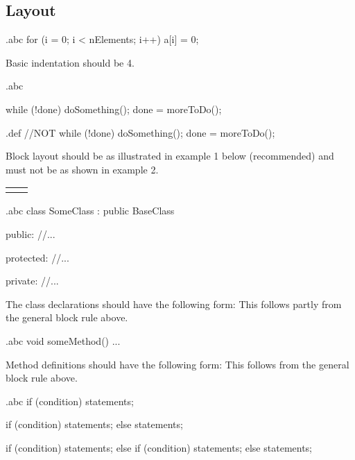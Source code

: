 \subsection{Layout}

\begin{filecontents*}{\jobname.abc}
    for (i = 0; i < nElements; i++)
        a[i] = 0;
\end{filecontents*}

\recommendation
{Basic indentation should be 4.}
{}
{}


\begin{filecontents*}{\jobname.abc}
	
	while (!done) {
	    doSomething();
	    done = moreToDo();
	}
\end{filecontents*}

\begin{filecontents*}{\jobname.def}
	//NOT
	while (!done)
	{
	    doSomething();
	    done = moreToDo();
	}
\end{filecontents*}

\recommendation
{Block layout should be as illustrated in example 1 below (recommended) and must not be as shown in example 2.}
{
	\begin{tabularx}{\linewidth}{p{.5\linewidth} p{.5\linewidth}}
		&
		
	\end{tabularx}
}
{}


\begin{filecontents*}{\jobname.abc}
	class SomeClass : public BaseClass
	{
		public:
		//...
		
		protected:
		//...
		
		private:
		//...
	}
\end{filecontents*}

\recommendation
{The class declarations should have the following form:}
{}
{This follows partly from the general block rule above.}


\begin{filecontents*}{\jobname.abc}
	void someMethod()
	{
		...
	}
\end{filecontents*}

\recommendation
{Method definitions should have the following form:}
{}
{This follows from the general block rule above.}


\begin{filecontents*}{\jobname.abc}
	if (condition) {
	    statements;
	}
	
	if (condition) {
	    statements;
	}
	else {
	    statements;
	}
	
	if (condition) {
	    statements;
	}
	else if (condition) {
	    statements;
	}
	else {
	    statements;
	}
\end{filecontents*}

